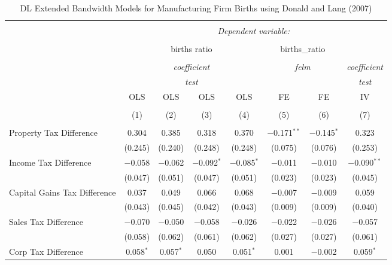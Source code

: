 
\begin{table}[!htbp] \centering 
  \caption{DL Extended Bandwidth Models for  Manufacturing Firm Births using Donald and Lang (2007)} 
  \label{} 
\begin{tabular}{@{\extracolsep{5pt}}lccccccc} 
\\[-1.8ex]\hline 
\hline \\[-1.8ex] 
 & \multicolumn{7}{c}{\textit{Dependent variable:}} \\ 
\cline{2-8} 
\\[-1.8ex] & \multicolumn{4}{c}{births ratio} & \multicolumn{2}{c}{births\_ratio} &   \\ 
\\[-1.8ex] & \multicolumn{4}{c}{\textit{coefficient}} & \multicolumn{2}{c}{\textit{felm}} & \textit{coefficient} \\ 
 & \multicolumn{4}{c}{\textit{test}} & \multicolumn{2}{c}{\textit{}} & \textit{test} \\ 
 & OLS & OLS & OLS & OLS & FE & FE & IV \\ 
\\[-1.8ex] & (1) & (2) & (3) & (4) & (5) & (6) & (7)\\ 
\hline \\[-1.8ex] 
 Property Tax Difference & 0.304 & 0.385 & 0.318 & 0.370 & $-$0.171$^{**}$ & $-$0.145$^{*}$ & 0.323 \\ 
  & (0.245) & (0.240) & (0.248) & (0.248) & (0.075) & (0.076) & (0.253) \\ 
  Income Tax Difference & $-$0.058 & $-$0.062 & $-$0.092$^{*}$ & $-$0.085$^{*}$ & $-$0.011 & $-$0.010 & $-$0.090$^{**}$ \\ 
  & (0.047) & (0.051) & (0.047) & (0.051) & (0.023) & (0.023) & (0.045) \\ 
  Capital Gains Tax Difference & 0.037 & 0.049 & 0.066 & 0.068 & $-$0.007 & $-$0.009 & 0.059 \\ 
  & (0.043) & (0.045) & (0.042) & (0.043) & (0.009) & (0.009) & (0.040) \\ 
  Sales Tax Difference & $-$0.070 & $-$0.050 & $-$0.058 & $-$0.026 & $-$0.022 & $-$0.026 & $-$0.057 \\ 
  & (0.058) & (0.062) & (0.061) & (0.062) & (0.027) & (0.027) & (0.061) \\ 
  Corp Tax Difference & 0.058$^{*}$ & 0.057$^{*}$ & 0.050 & 0.051$^{*}$ & 0.001 & $-$0.002 & 0.059$^{*}$ \\ 

\end{tabular}
\end{table}
